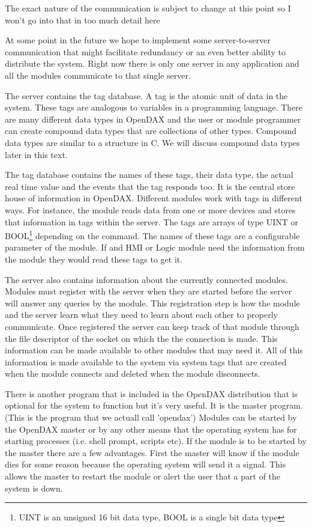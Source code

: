 The exact nature of the communication is subject to change at this point so I
won't go into that in too much detail here

At some point in the future we hope to implement some server-to-server communication that might facilitate redundancy or an even better ability to distribute the system.  Right now there is only one server in any application and all the modules communicate to that single server.

The server contains the tag database.  A tag is the atomic unit of data in the system.  These tags are analogous to variables in a programming language.  There are many different data types in OpenDAX and the user or module programmer can create compound data types that are collections of other types.  Compound data types are similar to a structure in C.  We will discuss compound data types later in this text.

The tag database contains the names of these tags, their data type, the actual real time value and the events that the tag responds too.  It is the central store house of information in OpenDAX.  Different modules work with tags in different ways.  For instance, the \modbus {}module reads data from one or more \modbus devices and stores that information in tags within the server.  The tags are arrays of type UINT or BOOL\footnote{UINT is an unsigned 16 bit data type, BOOL is a single bit data type} depending on the command.  The names of these tags are a configurable parameter of the \modbus module.  If and HMI or Logic module need the information from the \modbus module they would read these tags to get it.

The server also contains information about the currently connected modules. 
Modules must register with the server when they are started before the server
will answer any queries by the module.  This registration step is how the module
and the server learn what they need to learn about each other to properly
communicate.  Once registered the server can keep track of that module through
the file descriptor of the socket on which the the connection is made.  This
information can be made available to other modules that may need it.  All of
this information is made available to the system via system tags that are
created when the module connects and deleted when the module disconnects.

There is another program that is included in the OpenDAX distribution that is optional for the system to function but it's very useful.  It is the master program.  (This is the program that we actuall call 'opendax')  Modules can be started by the OpenDAX master or by any other means that the operating system has for starting processes (i.e. shell prompt, scripts etc).  If the module is to be started by the master there are a few advantages.  First the master will know if the module dies for some reason because the operating system will send it a signal.  This allows the master to restart the module or alert the user that a part of the system is down.

